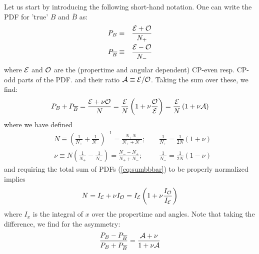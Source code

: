 \documentclass[a4paper,9pt,twosided]{article}
\begin{document}
Let us start by introducing the following short-hand notation. One can write the 
PDF for 'true' $B$ and $\overline{B}$ as:
\begin{eqnarray}
   P_{B}           &\equiv&\frac{ {\cal E} + {\cal O}}{N_+} \\
   P_{\overline{B}} &\equiv&\frac{ {\cal E} - {\cal O}}{N_-}
\end{eqnarray}
where ${\cal E}$ and ${\cal O}$ are the (propertime and angular dependent) CP-even resp. CP-odd parts of the PDF.
and their ratio ${\cal A} \equiv {\cal E / O }$.
Taking the sum over these, we find:
\begin{equation}
   P_{B} + P_{\overline{B}} =  \frac{ {\cal E} + \nu{\cal O} }{N}  = \frac{\cal E} {N} \left( 1 + \nu \frac{ \cal O }{\cal E} \right) = \frac{\cal E}{N} \left(1 + \nu {\cal A}\right)
   \label{eq:sumbbbar}
\end{equation}
where we have defined
\begin{eqnarray}
   &  N \equiv \left( \frac{1}{N_+}+\frac{1}{N_-}\right)^{-1} = \frac{N_+N_-}{N_+ + N_-};\;\;\;\; &  \frac{1}{N_+} =\frac{1}{2N}(1+\nu) \\
   &\nu \equiv N \left( \frac{1}{N_+}-\frac{1}{N_-}\right) = \frac{N_- - N_+}{N_+ +N_-}; & \frac{1}{N_-} =\frac{1}{2N}(1-\nu) 
\end{eqnarray}
and requiring the total sum of PDFs (\ref{eq:sumbbbar}) to be properly normalized implies
\begin{equation}
   N = I_{\cal E} + \nu I_{\cal O} 
     = I_{\cal E} \left( 1 + \nu \frac{ I_{\cal O}}{I_{\cal E}}   \right)
\end{equation}
where $I_x$ is the integral of $x$ over the propertime and angles.
Note that taking the difference, we find for the asymmetry:
\begin{equation}
  \frac{P_{B} - P_{\overline{B}}}{P_{B} + P_{\overline{B}}} =  \frac{ {\cal A} + \nu}{1+\nu{\cal A}}
   \label{eq:difbbbar}
\end{equation}
\end{document}
